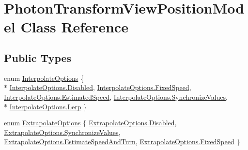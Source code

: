 \hypertarget{class_photon_transform_view_position_model}{}\section{Photon\+Transform\+View\+Position\+Model Class Reference}
\label{class_photon_transform_view_position_model}
\subsection*{Public Types}
\begin{DoxyCompactItemize}
\item 
enum \hyperlink{class_photon_transform_view_position_model_a36efab5955c4f805aa7ce703fc363063}{Interpolate\+Options} \{ \\*
\hyperlink{class_photon_transform_view_position_model_a36efab5955c4f805aa7ce703fc363063ab9f5c797ebbf55adccdd8539a65a0241}{Interpolate\+Options.\+Disabled}, 
\hyperlink{class_photon_transform_view_position_model_a36efab5955c4f805aa7ce703fc363063a8275b27924ce04ec0cbdf85a3f3dc866}{Interpolate\+Options.\+Fixed\+Speed}, 
\hyperlink{class_photon_transform_view_position_model_a36efab5955c4f805aa7ce703fc363063ad372923d229a8c3db765a1c1cdfcb19c}{Interpolate\+Options.\+Estimated\+Speed}, 
\hyperlink{class_photon_transform_view_position_model_a36efab5955c4f805aa7ce703fc363063a5ee3cb96945190e0162af2190c264380}{Interpolate\+Options.\+Synchronize\+Values}, 
\\*
\hyperlink{class_photon_transform_view_position_model_a36efab5955c4f805aa7ce703fc363063a412cb411cecf9196f717d6bc9c272c62}{Interpolate\+Options.\+Lerp}
 \}
\item 
enum \hyperlink{class_photon_transform_view_position_model_a81cc14379a959c4fc0e6b144360adb06}{Extrapolate\+Options} \{ \hyperlink{class_photon_transform_view_position_model_a81cc14379a959c4fc0e6b144360adb06ab9f5c797ebbf55adccdd8539a65a0241}{Extrapolate\+Options.\+Disabled}, 
\hyperlink{class_photon_transform_view_position_model_a81cc14379a959c4fc0e6b144360adb06a5ee3cb96945190e0162af2190c264380}{Extrapolate\+Options.\+Synchronize\+Values}, 
\hyperlink{class_photon_transform_view_position_model_a81cc14379a959c4fc0e6b144360adb06a20ce760ebf36c55f29b275b42f3d6217}{Extrapolate\+Options.\+Estimate\+Speed\+And\+Turn}, 
\hyperlink{class_photon_transform_view_position_model_a81cc14379a959c4fc0e6b144360adb06a8275b27924ce04ec0cbdf85a3f3dc866}{Extrapolate\+Options.\+Fixed\+Speed}
 \}
\end{DoxyCompactItemize}
